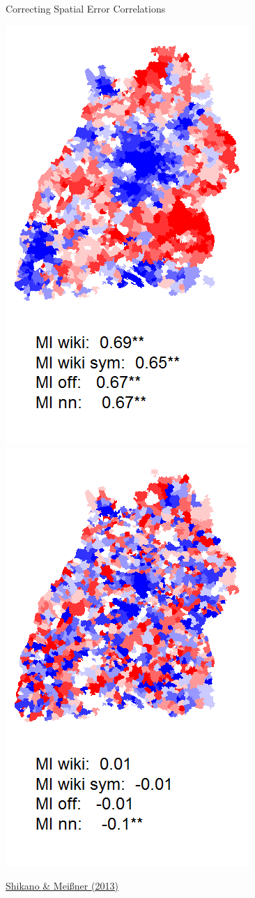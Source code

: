 \documentclass[ignorenonframetext,]{beamer}
\begin{document}
\begin{frame}{Correcting Spatial Error Correlations}

\includegraphics{fig/spatialerrors.png}\includegraphics{fig/spatialerrors2.png}

\href{http://pmeissner.com/downloads/Shikano_Meissner_2013.pdf}{Shikano
\& Meißner (2013)}

\end{frame}
\end{document}
